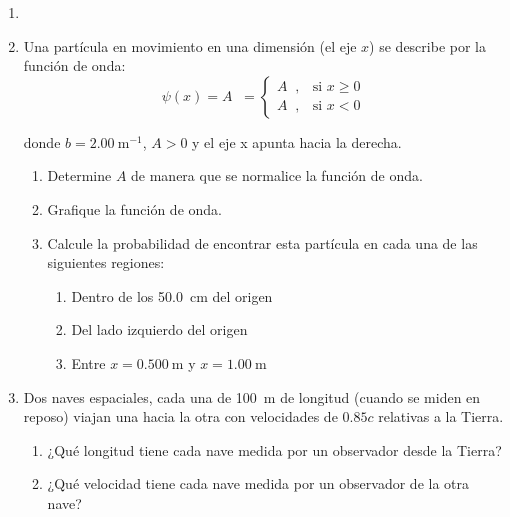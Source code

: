 \documentclass[letterpaper,11pt]{article}
\begin{document}
\vspace{-1cm}
\begin{enumerate}\setlength{\itemsep}{0.4cm}

\item[]

\item Una partícula en movimiento en una dimensión (el eje $x$) se describe por la función de onda:
\[\psi(x) = A \mathop{e^{-b|x|}} = 
\begin{cases}
    A\mathop{e^{-bx}}, & \text{si } x \geq 0\\
    A\mathop{e^{bx}}, & \text{si } x<0
\end{cases}\] 

donde $b = \SI{2.00}{\m^{-1}}$, $A>0$ y el eje x apunta hacia la derecha.
    \begin{enumerate}
        \item Determine $A$ de manera que se normalice la función de onda.
        
        \item Grafique la función de onda.
        
        \item Calcule la probabilidad de encontrar esta partícula en cada una de las siguientes regiones:
            \begin{enumerate}
                \item Dentro de los \SI{50.0}{\cm} del origen
                
                \item Del lado izquierdo del origen
                
                \item Entre $x = \SI{0.500}{\m}$ y $x = \SI{1.00}{\m}$
            \end{enumerate}
    \end{enumerate}

\item Dos naves espaciales, cada una de \SI{100}{\m} de longitud (cuando se miden en reposo) viajan una hacia la otra con velocidades de $0.85c$ relativas a la Tierra.

    \begin{enumerate}
        \item ¿Qué longitud tiene cada nave medida por un observador desde la Tierra?

        \item ¿Qué velocidad tiene cada nave medida por un observador de la otra nave?


\end{enumerate}
\end{enumerate}
\end{document}
